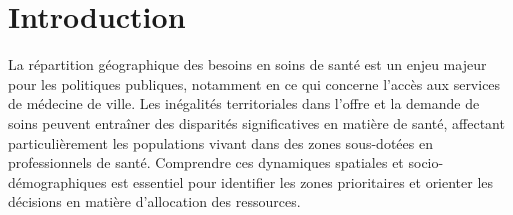 \documentclass[
]{article}
\author{}
\date{\vspace{-2.5em}}
\begin{document}
\setcounter{tocdepth}{5}                
\renewcommand\contentsname{\begin{center}\textcolor{brown}{Sommaire}\end{center}}
\AtBeginShipout{
  \ifnum\value{page}=1\thispagestyle{empty}\fi}
\pagestyle{fancy}
\fancyhf{}
\renewcommand{\headrulewidth}{0.4pt}
\renewcommand{\footrulewidth}{0.4pt}
\fancyhead[R]{\textcolor{brown}{@Alex, Ali, Richard \& Toussaint}}
\fancyfoot[C]{\thepage}

\tableofcontents

\newpage

\renewcommand\listtablename{\begin{center}\textcolor{brown}{Liste des Tableaux}\end{center}}
\renewcommand\listfigurename{\begin{center}\textcolor{brown}{Liste des Figures}\end{center}}

\setlength{\cftfignumwidth}{3em}
\setlength{\cfttabnumwidth}{3em}

\listoftables

\newpage

\listoffigures

\newpage

\section{Introduction}\label{introduction}

La répartition géographique des besoins en soins de santé est un enjeu
majeur pour les politiques publiques, notamment en ce qui concerne
l'accès aux services de médecine de ville. Les inégalités territoriales
dans l'offre et la demande de soins peuvent entraîner des disparités
significatives en matière de santé, affectant particulièrement les
populations vivant dans des zones sous-dotées en professionnels de
santé. Comprendre ces dynamiques spatiales et socio-démographiques est
essentiel pour identifier les zones prioritaires et orienter les
décisions en matière d'allocation des ressources.
\end{document}
